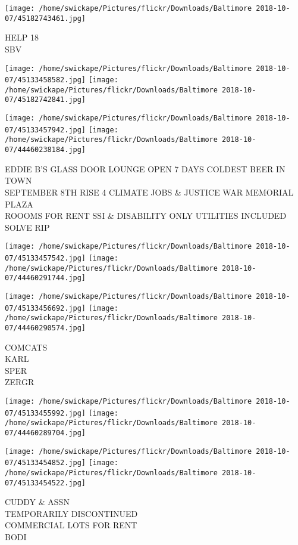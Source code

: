 \documentclass[10pt,letterpaper]{article}
\begin{document}
\vspace{0.25in}
\texttt{[image: /home/swickape/Pictures/flickr/Downloads/Baltimore 2018-10-07/45182743461.jpg]}

HELP 18\\
SBV\\
\pagebreak

\texttt{[image: /home/swickape/Pictures/flickr/Downloads/Baltimore 2018-10-07/45133458582.jpg]}
\texttt{[image: /home/swickape/Pictures/flickr/Downloads/Baltimore 2018-10-07/45182742841.jpg]}

\texttt{[image: /home/swickape/Pictures/flickr/Downloads/Baltimore 2018-10-07/45133457942.jpg]}
\texttt{[image: /home/swickape/Pictures/flickr/Downloads/Baltimore 2018-10-07/44460238184.jpg]}

EDDIE B'S GLASS DOOR LOUNGE OPEN 7 DAYS COLDEST BEER IN TOWN\\
SEPTEMBER 8TH RISE 4 CLIMATE JOBS \& JUSTICE WAR MEMORIAL PLAZA\\
ROOOMS FOR RENT SSI \& DISABILITY ONLY UTILITIES INCLUDED\\
SOLVE RIP\\
\pagebreak

\texttt{[image: /home/swickape/Pictures/flickr/Downloads/Baltimore 2018-10-07/45133457542.jpg]}
\texttt{[image: /home/swickape/Pictures/flickr/Downloads/Baltimore 2018-10-07/44460291744.jpg]}

\texttt{[image: /home/swickape/Pictures/flickr/Downloads/Baltimore 2018-10-07/45133456692.jpg]}
\texttt{[image: /home/swickape/Pictures/flickr/Downloads/Baltimore 2018-10-07/44460290574.jpg]}

COMCATS\\
KARL\\
SPER\\
ZERGR\\
\pagebreak

\texttt{[image: /home/swickape/Pictures/flickr/Downloads/Baltimore 2018-10-07/45133455992.jpg]}
\texttt{[image: /home/swickape/Pictures/flickr/Downloads/Baltimore 2018-10-07/44460289704.jpg]}

\texttt{[image: /home/swickape/Pictures/flickr/Downloads/Baltimore 2018-10-07/45133454852.jpg]}
\texttt{[image: /home/swickape/Pictures/flickr/Downloads/Baltimore 2018-10-07/45133454522.jpg]}

CUDDY \& ASSN\\
TEMPORARILY DISCONTINUED\\
COMMERCIAL LOTS FOR RENT\\
BODI\\
\pagebreak
\end{document}
